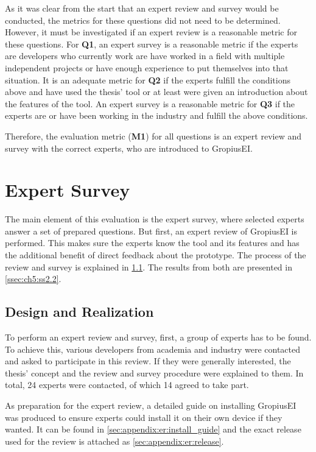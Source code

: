 As it was clear from the start that an expert review and survey would be conducted, the metrics for these questions did not need to be determined.
However, it must be investigated if an expert review is a reasonable metric for these questions.
For \textbf{Q1}, an expert survey is a reasonable metric if the experts are developers who currently work are have worked in a field with multiple independent projects or have enough experience to put themselves into that situation.
It is an adequate metric for \textbf{Q2} if the experts fulfill the conditions above and have used the thesis' tool or at least were given an introduction about the features of the tool.
An expert survey is a reasonable metric for \textbf{Q3} if the experts are or have been working in the industry and fulfill the above conditions.

Therefore, the evaluation metric (\textbf{M1}) for all questions is an expert review and survey with the correct experts, who are introduced to \gls{GropiusEI}. 

\section{Expert Survey}
\label{sec:ch5:s2}
The main element of this evaluation is the expert survey, where selected experts answer a set of prepared questions. 
But first, an expert review of \gls{GropiusEI} is performed.
This makes sure the experts know the tool and its features and has the additional benefit of direct feedback about the prototype.
The process of the review and survey is explained in \cref{ssec:ch5:ss2.1}.
The results from both are presented in \cref{ssec:ch5:ss2.2}.

\subsection{Design and Realization}
\label{ssec:ch5:ss2.1}
To perform an expert review and survey, first, a group of experts has to be found.
To achieve this, various developers from academia and industry were contacted and asked to participate in this review.
If they were generally interested, the thesis' concept and the review and survey procedure were explained to them.
In total, 24 experts were contacted, of which 14 agreed to take part.

As preparation for the expert review, a detailed guide on installing \gls{GropiusEI} was produced
to ensure experts could install it on their own device if they wanted.
It can be found in \cref{sec:appendix:er:install_guide} and
the exact release used for the review is attached as \cref{sec:appendix:er:release}.

